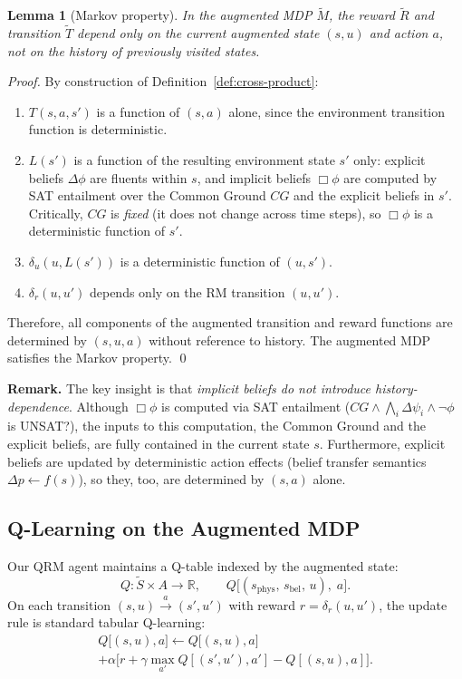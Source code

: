 \documentclass[letterpaper, 10 pt, conference]{ieeeconf}  %
\newtheorem{lemma}[theorem]{Lemma}
\newcommand{\EBel}[1]{\ensuremath{\Delta #1}} %
\newcommand{\IBel}[1]{\ensuremath{\Box #1}}   %
\newcommand{\CG}{\ensuremath{\mathit{CG}}}    %
\begin{document}
\begin{lemma}[Markov property]
\label{lem:markov}
In the augmented MDP $\tilde{M}$, the reward $\tilde{R}$ and transition $\tilde{T}$ depend only on the current augmented state $(s, u)$ and action $a$, not on the history of previously visited states.
\end{lemma}

\begin{proof}
By construction of Definition~\ref{def:cross-product}:
\begin{enumerate}
    \item $T(s,a,s')$ is a function of $(s, a)$ alone, since the environment transition function is deterministic.
    \item $L(s')$ is a function of the resulting environment state $s'$ only: explicit beliefs $\EBel{\phi}$ are fluents within $s$, and implicit beliefs $\IBel{\phi}$ are computed by SAT entailment over the Common Ground $\CG$ and the explicit beliefs in $s'$.  Critically, $\CG$ is \emph{fixed} (it does not change across time steps), so $\IBel{\phi}$ is a deterministic function of $s'$.
    \item $\delta_u(u, L(s'))$ is a deterministic function of $(u, s')$.
    \item $\delta_r(u, u')$ depends only on the RM transition $(u, u')$.
\end{enumerate}
Therefore, all components of the augmented transition and reward functions are determined by $(s, u, a)$ without reference to history. The augmented MDP satisfies the Markov property. \qed
\end{proof}

\noindent\textbf{Remark.}
The key insight is that \emph{implicit beliefs do not introduce history-dependence}.  Although $\IBel{\phi}$ is computed via SAT entailment ($\CG \land \bigwedge_i \EBel{\psi_i} \land \neg\phi$ is UNSAT?), the inputs to this computation, the Common Ground and the explicit beliefs, are fully contained in the current state $s$.  Furthermore, explicit beliefs are updated by deterministic action effects (belief transfer semantics $\EBel{p} \gets f(s)$), so they, too, are determined by $(s, a)$ alone.

\subsection{Q-Learning on the Augmented MDP}

Our QRM agent maintains a Q-table indexed by the augmented state:
\[
    Q : \tilde{S} \times A \to \mathbb{R}, \qquad
    Q\bigl[(s_{\mathrm{phys}},\, s_{\mathrm{bel}},\, u),\; a\bigr].
\]
On each transition $(s, u) \xrightarrow{a} (s', u')$ with reward $r = \delta_r(u, u')$, the update rule is standard tabular Q-learning:
\begin{multline}
\label{eq:q-update}
Q\bigl[(s,u),a\bigr] \leftarrow Q\bigl[(s,u),a\bigr] \\
    + \alpha\bigl[r + \gamma\max_{a'} Q[(s',u'),a'] - Q[(s,u),a]\bigr].
\end{multline}
\end{document}

